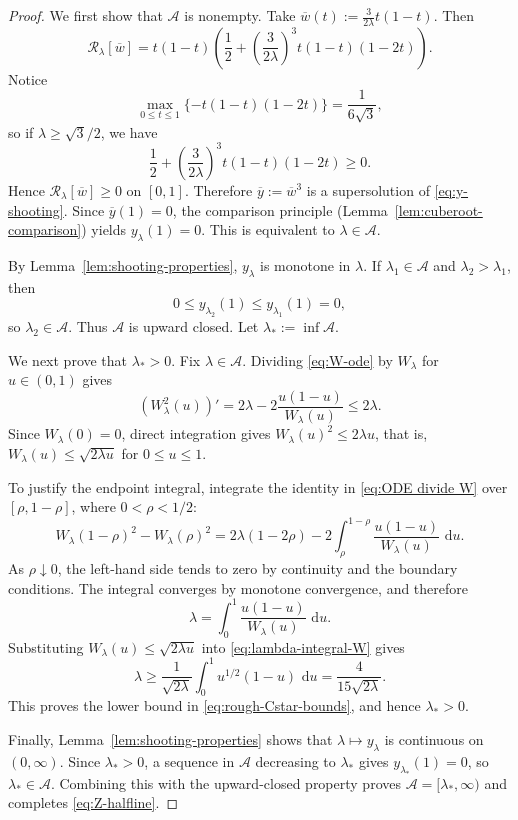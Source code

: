 \documentclass[a4paper,fleqn]{cas-sc}
\numberwithin{equation}{section}
\theoremstyle{plain}
\theoremstyle{definition}
\newcommand{\dd}{\,\mathrm d}
\begin{document}
\begin{proof}
We first show that \(\mathcal A\) is nonempty. Take \(\overline w(t):=\frac{3}{2\lambda}t(1-t)\).
Then
\[
 \mathcal R_\lambda[\overline w]
 =t(1-t)\left(\frac{1}{2}+\left(\frac{3}{2\lambda}\right)^3t(1-t)(1-2t)\right).
\]
Notice
\[
 \max_{0\le t\le1}\{-t(1-t)(1-2t)\}=\frac1{6\sqrt3},
\]
so if \(\lambda\ge\sqrt3/2\), we have
\[
\frac{1}{2}+\left(\frac{3}{2\lambda}\right)^3t(1-t)(1-2t) \ge 0.
\]
Hence
\(\mathcal R_\lambda[\overline w]\ge0\) on \([0,1]\).  Therefore \(\overline y:=\overline w^3\) is a supersolution of
\eqref{eq:y-shooting}.  Since $\overline y(1)=0$, the comparison
principle (Lemma~\ref{lem:cuberoot-comparison}) yields
\(y_\lambda(1)=0\). This is equivalent to \(\lambda\in\mathcal A\).

By Lemma~\ref{lem:shooting-properties}, $y_\lambda$ is monotone in
$\lambda$.  If $\lambda_1\in\mathcal A$ and $\lambda_2>\lambda_1$, then
\[
 0\le y_{\lambda_2}(1)\le y_{\lambda_1}(1)=0,
\]
so $\lambda_2\in\mathcal A$.  Thus $\mathcal A$ is upward closed.  Let
$\lambda_*:=\inf\mathcal A$.

We next prove that $\lambda_*>0$.  Fix $\lambda\in\mathcal A$.  Dividing
\eqref{eq:W-ode} by $W_\lambda$ for $u\in(0,1)$ gives
\begin{equation}
 (W_\lambda^2(u))'
 =2\lambda-2\frac{u(1-u)}{W_\lambda(u)}
 \le2\lambda.
 \label{eq:ODE divide W}
\end{equation}
Since $W_\lambda(0)=0$, direct integration gives
$W_\lambda(u)^2\le2\lambda u$, that is,
$W_\lambda(u)\le\sqrt{2\lambda u}$ for $0\le u\le1$.

To justify the endpoint integral, integrate the identity in
\eqref{eq:ODE divide W} over $[\rho,1-\rho]$, where $0<\rho<1/2$:
\[
 W_\lambda(1-\rho)^2-W_\lambda(\rho)^2
 =2\lambda(1-2\rho)
  -2\int_\rho^{1-\rho}
      \frac{u(1-u)}{W_\lambda(u)}\,\dd u.
\]
As $\rho\downarrow0$, the left-hand side tends to zero by continuity and
the boundary conditions.  The integral converges by monotone convergence,
and therefore
\begin{equation}
 \lambda=\int_0^1\frac{u(1-u)}{W_\lambda(u)}\,\dd u.
 \label{eq:lambda-integral-W}
\end{equation}
Substituting $W_\lambda(u)\le\sqrt{2\lambda u}$ into
\eqref{eq:lambda-integral-W} gives
\[
 \lambda\ge\frac1{\sqrt{2\lambda}}
 \int_0^1u^{1/2}(1-u)\,\dd u
 =\frac4{15\sqrt{2\lambda}}.
\]
This proves the lower bound in \eqref{eq:rough-Cstar-bounds}, and hence
$\lambda_*>0$.

Finally, Lemma~\ref{lem:shooting-properties} shows that
$\lambda\mapsto y_\lambda$ is continuous on $(0,\infty)$.  Since
$\lambda_*>0$, a sequence in $\mathcal A$ decreasing to $\lambda_*$ gives
$y_{\lambda_*}(1)=0$, so $\lambda_*\in\mathcal A$.  Combining this with
the upward-closed property proves $\mathcal A=[\lambda_*,\infty)$ and
completes \eqref{eq:Z-halfline}.
\end{proof}
\end{document}
